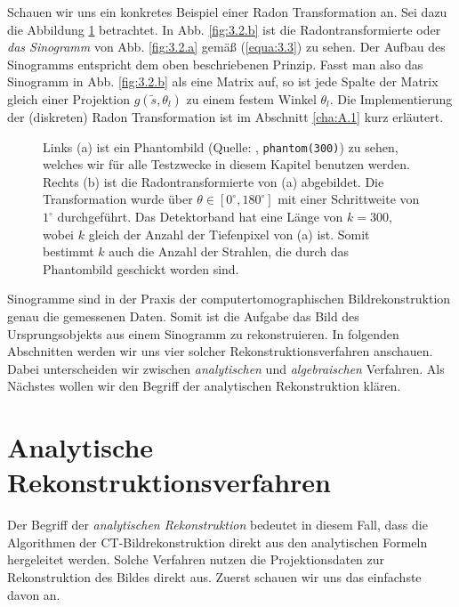 Schauen wir uns ein konkretes Beispiel einer Radon Transformation an. Sei dazu die Abbildung \ref{fig:3.2} betrachtet. In Abb. \ref{fig:3.2.b} ist die Radontransformierte oder \textit{das Sinogramm} von Abb. \ref{fig:3.2.a} gemäß (\ref{equa:3.3}) zu sehen. Der Aufbau des Sinogramms entspricht dem oben beschriebenen Prinzip. Fasst man also das Sinogramm in Abb. \ref{fig:3.2.b} als eine Matrix auf, so ist jede Spalte der Matrix gleich einer Projektion $g(\tilde{s}, \theta_l)$ zu einem festem Winkel $\theta_l$. Die Implementierung der (diskreten) Radon Transformation ist im Abschnitt \ref{cha:A.1} kurz erläutert.
\begin{figure}[H]
	\begin{center}
	\end{center}
	\caption{ Links (a) ist ein Phantombild (Quelle: \MATLAB, \texttt{\captionstring phantom(300)}) zu sehen, welches wir für alle Testzwecke in diesem Kapitel benutzen werden. Rechts (b) ist die Radontransformierte von (a) abgebildet. Die Transformation wurde über $\theta \in [0^{\circ}, 180^{\circ}]$ mit einer Schrittweite von $1^{\circ}$ durchgeführt. Das Detektorband hat eine Länge von $k = 300$, wobei $k$ gleich der Anzahl der Tiefenpixel von (a) ist. Somit bestimmt $k$ auch die Anzahl der Strahlen, die durch das Phantombild geschickt worden sind.}
	\label{fig:3.2}
\end{figure}

Sinogramme sind in der Praxis der computertomographischen Bildrekonstruktion genau die gemessenen Daten. Somit ist die Aufgabe das Bild des Ursprungsobjekts aus einem Sinogramm zu rekonstruieren. In folgenden Abschnitten werden wir uns vier solcher Rekonstruktionsverfahren anschauen. Dabei unterscheiden wir zwischen \textit{analytischen} und \textit{algebraischen} Verfahren. Als Nächstes wollen wir den Begriff der analytischen Rekonstruktion klären.

\section*{Analytische Rekonstruktionsverfahren}
\label{cha:3.1}

Der Begriff der \textit{analytischen Rekonstruktion} bedeutet in diesem Fall, dass die Algorithmen der CT-Bildrekonstruktion direkt aus den analytischen Formeln hergeleitet werden. Solche Verfahren nutzen die Projektionsdaten zur Rekonstruktion des Bildes direkt aus. Zuerst schauen wir uns das einfachste davon an.

